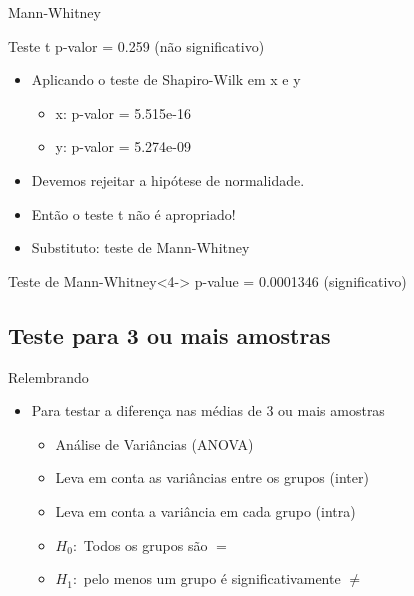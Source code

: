\documentclass{beamer}
\begin{document}
\begin{frame}{Mann-Whitney}
  \begin{exampleblock}{Teste t}
    \small
    p-valor = 0.259 (não significativo)
  \end{exampleblock}
  \begin{itemize}
    \small
  \item<2-> Aplicando o teste de Shapiro-Wilk em x e y
    \begin{itemize}
      \scriptsize
    \item<2-> x: p-valor = 5.515e-16
    \item<2-> y: p-valor = 5.274e-09
    \end{itemize}
    \bigskip
  \item<3-> Devemos rejeitar a hipótese de normalidade.
  \item<3-> Então o teste t \alert{não é} apropriado!
  \item<3-> Substituto: teste de Mann-Whitney
  \end{itemize}
  \begin{exampleblock}{Teste de Mann-Whitney}<4->
    \small
    p-value = \alert{0.0001346} (significativo)
  \end{exampleblock}
\end{frame}

\subsection[3+ amostras]{Teste para 3 ou mais amostras}

\begin{frame}{Relembrando}
  \begin{itemize}
  \item Para testar a diferença nas médias de 3 ou mais amostras
    \begin{itemize}
    \item Análise de Variâncias (ANOVA)
      \bigskip
    \item Leva em conta as variâncias entre os grupos (\alert{inter})
    \item Leva em conta a variância em cada grupo (\alert{intra})
      \bigskip
    \item $H_0:$ Todos os grupos são $=$
      \bigskip
    \item $H_1:$ pelo menos um grupo é significativamente $\ne$
    \end{itemize}
  \end{itemize}
\end{frame}
\end{document}
